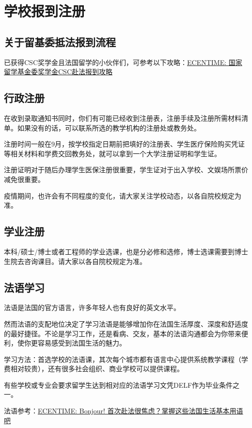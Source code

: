 \documentclass[UTF8]{ctexart}
\begin{document}
\newpage
\section{学校报到注册}
\subsection{关于留基委抵法报到流程}
已获得CSC奖学金且法国留学的小伙伴们，可参考以下攻略：\href{https://www.ecentime.com/article/CSC-China-Scholarship}{ECENTIME: 国家留学基金委奖学金CSC赴法报到攻略} 

\subsection{行政注册}
在收到录取通知书同时，你们有可能已经收到注册表，注册手续及注册所需材料清单。如果没有的话，可以联系所选的教学机构的注册处或教务处。

注册时间一般在9月，按学校指定日期前把填好的注册表、学生医疗保险购买凭证等相关材料和学费交回教务处，就可以拿到一个大学注册证明和学生证。

注册证明对于随后办理学生医保注册很重要，学生证对于出入学校、文娱场所票价减免很重要。

疫情期间，也许会有不同程度的变化，请大家关注学校动态，以各自院校规定为准。

\subsection{学业注册}
本科/硕士/博士或者工程师的学业选课，也是分必修和选修，博士选课需要到博士生院去咨询课目。请大家以各自院校规定为准。

\subsection{法语学习}

法语是法国的官方语言，许多年轻人也有良好的英文水平。

然而法语的支配地位决定了学习法语是能够增加你在法国生活厚度、深度和舒适度的最好捷径。不论是学习工作，还是看病、交友，基本的法语沟通都会为你带来便利，使你更容易感受到法国生活的魅力。

学习方法：首选学校的法语课，其次每个城市都有语言中心提供系统教学课程（学费相对较贵），还有很多社会组织、商业学校可以提供课程。

有些学校或专业会要求留学生达到相对应的法语学习文凭DELF作为毕业条件之一。

法语参考：\href{https://www.ecentime.com/article/francais-quotidien-}{ECENTIME: Bonjour! 首次赴法很焦虑？掌握这些法国生活基本用语吧 }
\end{document}
